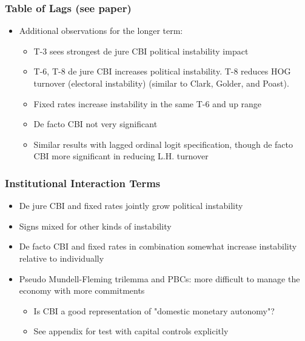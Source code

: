 \documentclass{beamer}
\begin{document}
    \begin{frame}
        \frametitle{Table of Lags (see paper)}
        \begin{itemize}
            \item Additional observations for the longer term:
            \begin{itemize}
                \item T-3 sees strongest de jure CBI political instability impact
                \item T-6, T-8 de jure CBI increases political instability. T-8 reduces HOG turnover (electoral instability) (similar to Clark, Golder, and Poast).
                \item Fixed rates increase instability in the same T-6 and up range
                \item De facto CBI not very significant
                \item Similar results with lagged ordinal logit specification, though de facto CBI more significant in reducing L.H. turnover
            \end{itemize}
        \end{itemize}
    \end{frame}

    \begin{frame}
        \frametitle{Institutional Interaction Terms}
        \begin{itemize}
            \item De jure CBI and fixed rates jointly grow political instability
            \item Signs mixed for other kinds of instability
            \item De facto CBI and fixed rates in combination somewhat increase instability relative to individually
            \item Pseudo Mundell-Fleming trilemma and PBCs: more difficult to manage the economy with more commitments
            \begin{itemize}
                \item Is CBI a good representation of "domestic monetary autonomy"?
                \item See appendix for test with capital controls explicitly
            \end{itemize}
        \end{itemize}
    \end{frame}
\end{document}
